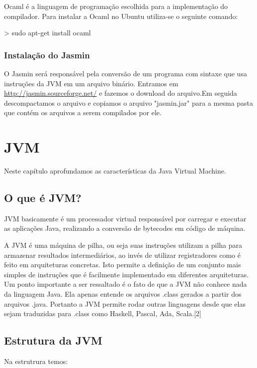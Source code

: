 \documentclass[12pt,a4paper,twoside]{report}
\begin{document}
           Ocaml é a linguagem de programação escolhida para a implementação do compilador. Para instalar a Ocaml no Ubuntu utiliza-se o seguinte comando:

         \begin{terminal}
         > sudo apt-get install ocaml
         \end{terminal}

\subsection{Instalação do Jasmin}
O Jasmin será responsável pela conversão de um programa com sintaxe que usa instruções da JVM em um arquivo binário.
Entramos em \url{http://jasmin.sourceforge.net/} e fazemos o download do arquivo.Em seguida descompactamos o arquivo e copiamos o arquivo "jasmin.jar" para a mesma pasta que contém os arquivos a serem compilados por ele.



\chapter{JVM}
Neste capítulo aprofundamos as características da Java Virtual Machine.
\section{O que é JVM?}
JVM basicamente é um processador virtual responsável por carregar e executar as aplicações Java, realizando a conversão de bytecodes em código de máquina. 

A JVM é uma máquina de pilha, ou seja suas instruções utilizam a
pilha para armazenar resultados intermediários, ao invés de utilizar registradores como é feito em
arquiteturas concretas. Isto permite a definição de um conjunto mais simples de instruções que é
facilmente implementado em diferentes arquiteturas.
Um ponto importante a ser ressaltado é o fato de que a JVM não conhece nada da
linguagem Java. Ela apenas entende  os arquivos .class gerados a partir dos arquivos .java. Portanto
a JVM permite rodar outras linguagens desde que elas sejam traduzidas para .class como Haskell, Pascal, Ada, Scala.[2]
\section{Estrutura da JVM}
Na estrutrura temos:
\end{document}

